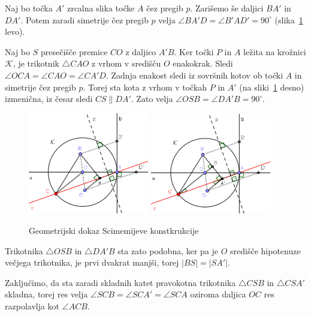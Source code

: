 \begin{dokaz}
    Naj bo točka $A'$ zrcalna slika točke $A$ čez pregib $p$. Zarišemo še daljici $BA'$ in $DA'$. Potem zaradi simetrije čez pregib $p$ velja $\angle BA'D = \angle B'AD' = 90^\circ$ (slika~\ref{fig:scimemi_dokaz} levo).

    Naj bo $S$ presečišče premice $CO$ z daljico $A'B$. Ker točki $P$ in $A$ ležita na krožnici $\mathcal{K}$, je trikotnik $\triangle CAO$ z vrhom v središču $O$ enakokrak. Sledi $\angle OCA = \angle CAO = \angle CA'D$. Zadnja enakost sledi iz sovršnih kotov ob točki $A$ in simetrije čez pregib $p$. Torej sta kota z vrhom v točkah $P$ in $A'$ (na sliki~\ref{fig:scimemi_dokaz} desno) izmenična, iz česar sledi $CS \parallel DA'$. Zato velja $\angle OSB = \angle DA'B = 90^\circ$.

    \begin{figure}[h]
        \centering
        \includegraphics[width=0.47\textwidth]{images/alhazen/scimemi_dokaz1.png}
        \includegraphics[width=0.47\textwidth]{images/alhazen/scimemi_dokaz2.png}
        \caption[Dokaz Scimemijeve konstrukcije]{Geometrijski dokaz Scimemijeve konstkrukcije}
        \label{fig:scimemi_dokaz}
    \end{figure}

    Trikotnika $\triangle OSB$ in $\triangle DA'B$ sta zato podobna, ker pa je $O$ središče hipotenuze večjega trikotnika, je prvi dvakrat manjši, torej $|BS| = |SA'|$.

    Zaključimo, da sta zaradi skladnih katet pravokotna trikotnika $\triangle CSB$ in $\triangle CSA'$ skladna, torej res velja $\angle SCB = \angle SCA' = \angle SCA$ oziroma daljica $OC$ res razpolavlja kot $\angle ACB$.
\end{dokaz}

